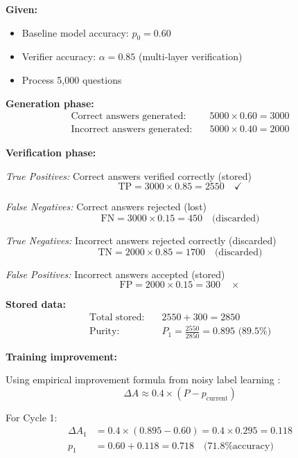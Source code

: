 \documentclass[12pt,a4paper]{article}
\theoremstyle{definition}
\begin{document}
\begin{examplebox}[title=Cycle 1 Detailed Calculation]

\textbf{Given:}
\begin{itemize}
    \item Baseline model accuracy: $p_0 = 0.60$
    \item Verifier accuracy: $\alpha = 0.85$ (multi-layer verification)
    \item Process 5,000 questions
\end{itemize}

\textbf{Generation phase:}
\begin{align}
\text{Correct answers generated:} \quad & 5000 \times 0.60 = 3000 \\
\text{Incorrect answers generated:} \quad & 5000 \times 0.40 = 2000
\end{align}

\textbf{Verification phase:}

\textit{True Positives:} Correct answers verified correctly (stored)
\begin{equation}
\text{TP} = 3000 \times 0.85 = 2550 \quad \checkmark
\end{equation}

\textit{False Negatives:} Correct answers rejected (lost)
\begin{equation}
\text{FN} = 3000 \times 0.15 = 450 \quad \text{(discarded)}
\end{equation}

\textit{True Negatives:} Incorrect answers rejected correctly (discarded)
\begin{equation}
\text{TN} = 2000 \times 0.85 = 1700 \quad \text{(discarded)}
\end{equation}

\textit{False Positives:} Incorrect answers accepted (stored)
\begin{equation}
\text{FP} = 2000 \times 0.15 = 300 \quad \times
\end{equation}

\textbf{Stored data:}
\begin{align}
\text{Total stored:} \quad & 2550 + 300 = 2850 \\
\text{Purity:} \quad & P_1 = \frac{2550}{2850} = 0.895 \text{ (89.5\%)}
\end{align}

\textbf{Training improvement:}

Using empirical improvement formula from noisy label learning \cite{natarajan2013learning}:
\begin{equation}
\Delta A \approx 0.4 \times (P - p_{\text{current}})
\end{equation}

For Cycle 1:
\begin{align}
\Delta A_1 &= 0.4 \times (0.895 - 0.60) = 0.4 \times 0.295 = 0.118 \\
p_1 &= 0.60 + 0.118 = 0.718 \quad \text{(71.8\% accuracy)}
\end{align}
\end{examplebox}
\end{document}

